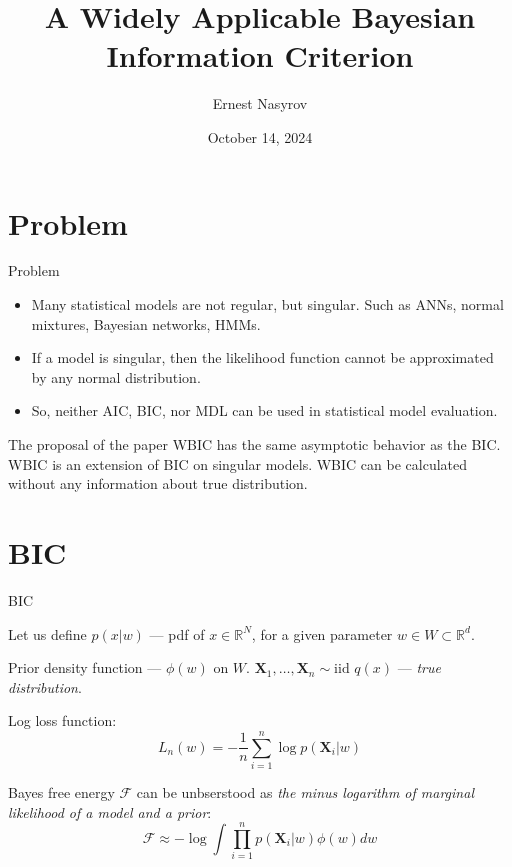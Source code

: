 \documentclass{beamer}
\begin{document}
\title{A Widely Applicable Bayesian Information Criterion}  
\author{Ernest Nasyrov}
\date{October 14, 2024} 
\frame{\titlepage} 
\begin{frame}
    \tableofcontents
\end{frame}
\section{Problem}
\begin{frame}
\begin{block}{Problem}
\begin{itemize}
    \item Many statistical models are not regular, but singular. Such as ANNs, normal mixtures, Bayesian networks, HMMs. 
    \item If a model is singular, then the likelihood function cannot be approximated by any normal distribution.
    \item So, neither AIC, BIC, nor MDL can be used in statistical model evaluation.
\end{itemize}
\end{block}

\begin{block}{The proposal of the paper}
WBIC has the same asymptotic behavior as the BIC. WBIC is an extension of BIC on singular models. WBIC can be calculated without any information about true distribution.
\end{block}
\end{frame}
\section{BIC}
\begin{frame}{BIC}

Let us define $p(x|w)$ --- pdf of $x \in \mathbb{R}^N$, for a given parameter $w \in W \subset \mathbb{R}^d$. 

Prior density function --- $\phi(w)$ on $W$. $\mathbf{X}_1, \dots, \mathbf{X}_n \sim \text{iid  } q(x)$ --- \textit{true distribution}.

Log loss function:
$$
L_n(w) = -\frac{1}{n}\sum\limits_{i=1}^n
\log p(\mathbf{X}_i|w)
$$


Bayes free energy $\mathcal{F}$ can be unbserstood as \textit{the minus logarithm of marginal likelihood of a model and a prior}:
$$
\mathcal{F} \approx -\log \int \prod\limits_{i=1}^np(\mathbf{X}_i|w)\phi(w)dw
$$
\end{frame}
\end{document}
